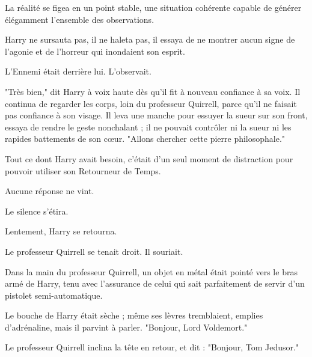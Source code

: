 La réalité se figea en un point stable, une situation cohérente capable de générer élégamment l'ensemble des observations.

Harry ne sursauta pas, il ne haleta pas, il essaya de ne montrer aucun signe de l'agonie et de l'horreur qui inondaient son esprit.

L'Ennemi était derrière lui. L'observait.

"Très bien," dit Harry à voix haute dès qu'il fit à nouveau confiance à sa voix. Il continua de regarder les corps, loin du professeur Quirrell, parce qu'il ne faisait pas confiance à son visage. Il leva une manche pour essuyer la sueur sur son front, essaya de rendre le geste nonchalant ; il ne pouvait contrôler ni la sueur ni les rapides battements de son cœur. "Allons chercher cette pierre philosophale."

Tout ce dont Harry avait besoin, c'était d'un seul moment de distraction pour pouvoir utiliser son Retourneur de Temps.

Aucune réponse ne vint.

Le silence s'étira.

Lentement, Harry se retourna.

Le professeur Quirrell se tenait droit. Il souriait.

Dans la main du professeur Quirrell, un objet en métal était pointé vers le bras armé de Harry, tenu avec l'assurance de celui qui sait parfaitement de servir d'un pistolet semi-automatique.

Le bouche de Harry était sèche ; même ses lèvres tremblaient, emplies d'adrénaline, mais il parvint à parler. "Bonjour, Lord Voldemort."

Le professeur Quirrell inclina la tête en retour, et dit : "Bonjour, Tom Jedusor."

